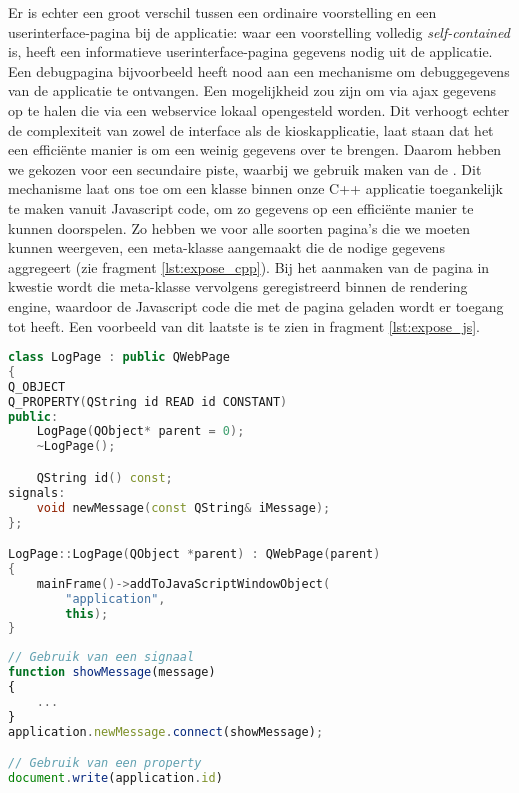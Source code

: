 Er is echter een groot verschil tussen een ordinaire voorstelling en een userinterface-pagina bij de applicatie: waar een voorstelling volledig \emph{self-contained} is, heeft een informatieve userinterface-pagina gegevens nodig uit de applicatie. Een debugpagina bijvoorbeeld heeft nood aan een mechanisme om debuggegevens van de applicatie te ontvangen.
Een mogelijkheid zou zijn om via \ac{ajax} gegevens op te halen die via een webservice lokaal opengesteld worden. Dit verhoogt echter de complexiteit van zowel de interface als de kioskapplicatie, laat staan dat het een efficiënte manier is om een weinig gegevens over te brengen. Daarom hebben we gekozen voor een secundaire piste, waarbij we gebruik maken van de . Dit mechanisme laat ons toe om een klasse binnen onze C++ applicatie toegankelijk te maken vanuit Javascript code, om zo gegevens op een efficiënte manier te kunnen doorspelen. Zo hebben we voor alle soorten pagina's die we moeten kunnen weergeven, een meta-klasse aangemaakt die de nodige gegevens aggregeert (zie fragment \ref{lst:expose_cpp}). Bij het aanmaken van de pagina in kwestie wordt die meta-klasse vervolgens geregistreerd binnen de rendering engine, waardoor de Javascript code die met de pagina geladen wordt er toegang tot heeft. Een voorbeeld van dit laatste is te zien in fragment \ref{lst:expose_js}.

\begin{lstlisting}[language=C++, float, caption=Registratie van een klase binnen de rendering engine., label=lst:expose_cpp]
class LogPage : public QWebPage
{
Q_OBJECT
Q_PROPERTY(QString id READ id CONSTANT)
public:
    LogPage(QObject* parent = 0);
    ~LogPage();

    QString id() const;
signals:
    void newMessage(const QString& iMessage);
};

LogPage::LogPage(QObject *parent) : QWebPage(parent)
{
    mainFrame()->addToJavaScriptWindowObject(
    	"application",
        this);
}
\end{lstlisting}

\begin{lstlisting}[language=JavaScript, float, caption=Gebruik van een geregistreerde C++ klasse., label=lst:expose_js]
// Gebruik van een signaal
function showMessage(message)
{
	...
}
application.newMessage.connect(showMessage);

// Gebruik van een property
document.write(application.id)
\end{lstlisting}


